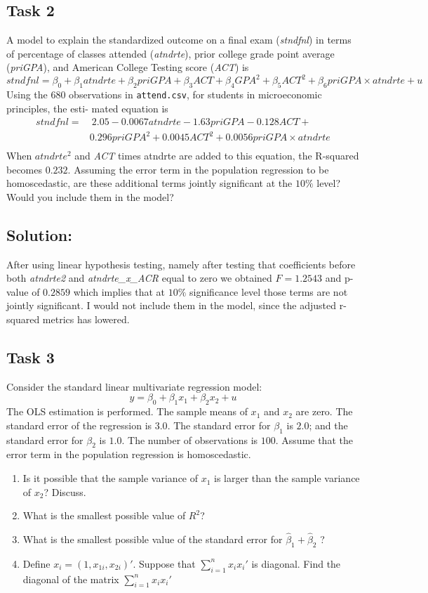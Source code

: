 \documentclass[10pt,a4paper]{amsart}
\begin{document}
\subsection*{Task 2}
A model to explain the standardized outcome on a final exam (\textit{stndfnl}) in terms of percentage of classes
attended (\textit{atndrte}), prior college grade point average (\textit{priGPA}), and American College Testing score
(\textit{ACT}) is
\[
      stndfnl = \beta_0 + \beta_1 atndrte + \beta_2 priGPA + \beta_3 ACT +\beta_4  GPA^{2} + \beta_5ACT^{2}+
      \beta_{6}priGPA \times atndrte + u  \]
Using the 680 observations in \texttt{attend.csv}, for students in microeconomic principles, the esti- mated equation is
\begin{align*}
      stndfnl = & ~ 2.05 − 0.0067atndrte − 1.63priGPA − 0.128ACT +        \\
                & 0.296priGPA^2 +0.0045ACT^2 +0.0056priGPA \times atndrte \\
\end{align*}
When $ atndrte^2 $  and \textit{ACT} times atndrte are added to this equation, the R-squared becomes
$ 0.232 $.  Assuming the error term in the population regression to be homoscedastic, are these
additional terms jointly significant at the $ 10\% $ level? Would you include them in the model?
\subsection*{Solution:}
After using linear hypothesis testing, namely after testing that coefficients before both \textit{atndrte2}
and \textit{atndrte\_x\_ACR} equal to zero we obtained $ F = 1.2543 $ and p-value of $ 0.2859 $ which implies
that at $ 10\% $ significance level those terms are not jointly significant. I would not include them
in the model, since the adjusted r-squared metrics has lowered.
\subsection*{Task 3}
Consider the standard linear multivariate regression model:
\[
      y = \beta_0 + \beta_1 x_1 + \beta_2 x_2 + u
\]
The OLS estimation is performed. The sample means of $ x_1 $ and $ x_2 $ are zero. The standard error
of the regression is $ 3.0 $. The standard error for $ \beta_1 $ is $ 2.0 $; and the standard error
for $ \beta_2 $ is $ 1.0 $. The number of observations is $ 100 $. Assume that the error term in
the population regression is homoscedastic.
\begin{enumerate}
      \item Is it possible that the sample variance of $ x_1 $ is larger than the sample variance of
            $ x_2 $? Discuss.
      \item What is the smallest possible value of $ R^{2} $?
      \item What is the smallest possible value of the standard error for $ \hat{\beta}_1  + \hat{\beta}_{2}$  ?
      \item Define $ x_i = (1, x_{1i}, x_{2i})' $. Suppose that $ \sum_{i=1}^{n} x_ix_{i}' $ is diagonal.
            Find the diagonal of the matrix $ \sum_{i=1}^{n} x_ix_i' $
\end{enumerate}
\end{document}
